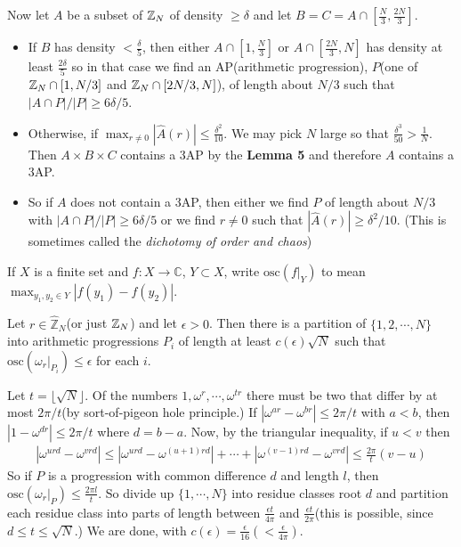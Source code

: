 \documentclass[12pt,a4paper]{report}
\renewcommand{\hat}{\widehat}
\newenvironment{proof}
{\begin{changemargin}{1cm}{0.5cm}
	}%
	{\end{changemargin}
}
\begin{document}
Now let $A$ be a subset of $\mathbb{Z}_N$ of density $\geq \delta$ and let $B=C = A\cap [\frac{N}{3},\frac{2N}{3}]$. 

\begin{itemize}
\item  If $B$ has density $< \frac{\delta}{5}$, then either $A \cap [1,\frac{N}{3}]$ or $A\cap [\frac{2N}{3},N]$ has density at least $\frac{2\delta}{5}$ so in that case we find an AP(arithmetic progression), $P$(one of $\mathbb{Z}_N \cap [1,N/3]$ and $\mathbb{Z}_N \cap [2N/3,N]$), of length about $N/3$ such that $|A\cap P| /|P| \geq 6\delta /5$.

\item Otherwise, if $\max_{r\neq 0} |\hat{A}(r)| \leq \frac{\delta^2}{10}$. We may pick $N$ large so that $\frac{\delta^3}{50} > \frac{1}{N}$. Then $A \times B \times C$ contains a 3AP by the \textbf{Lemma 5} and therefore $A$ contains a 3AP.

\item So if $A$ does not contain a 3AP, then either we find $P$ of length about $N/3$ with $|A \cap P|/|P| \geq 6\delta/5$ or we find $r\neq 0$ such that $|\hat{A}(r)| \geq \delta^2/10$. (This is sometimes called the \emph{dichotomy of order and chaos})
\end{itemize}

\s

 If $X$ is a finite set and $f: X \rightarrow \mathbb{C}$, $Y\subset X$, write $\text{osc}(f\big|_{Y})$ to mean $\max_{y_1,y_2 \in Y} |f(y_1) - f(y_2) |$.
\s

 Let $r \in \hat{\mathbb{Z}}_N$(or just $\mathbb{Z}_N$) and let $\epsilon>0$. Then there is a partition of $\{ 1,2,\cdots, N\}$ into arithmetic progressions $P_i$ of length at least $c(\epsilon)\sqrt{N}$ such that $\text{osc}(\omega_r \big|_{P_i}) \leq \epsilon$ for each $i$.

\begin{proof}
\pf Let $t= \lfloor \sqrt{N} \rfloor$. Of the numbers $1,\omega^r,\cdots,\omega^{tr}$ there must be two that differ by at most $2\pi/t$(by sort-of-pigeon hole principle.) If $|\omega^{ar} - \omega^{br} | \leq 2\pi /t$ with $a<b$, then $|1-\omega^{dr}| \leq 2\pi /t$ where $d= b-a$. Now, by the triangular inequality, if $u<v$ then
\begin{align*}
|\omega^{urd} - \omega^{vrd} | \leq |\omega^{urd} - \omega^{(u+1)rd} | + \cdots + |\omega^{(v-1)rd} - \omega^{vrd} | \leq \frac{2\pi}{t} (v-u)
\end{align*}
So if $P$ is a progression with common difference $d$ and length $l$, then $\text{osc} (\omega_{r} \big|_{P}) \leq \frac{2\pi l}{t}$. So divide up $\{1,\cdots, N\}$ into residue classes root $d$ and partition each residue class into parts of length between $\frac{\epsilon t}{4\pi}$ and $\frac{\epsilon t}{2\pi}$(this is possible, since $d\leq t \leq \sqrt{N}$.) We are done, with $c(\epsilon) = \frac{\epsilon}{16}(<\frac{\epsilon}{4\pi})$.

\eop
\end{proof}
\s
\end{document}
